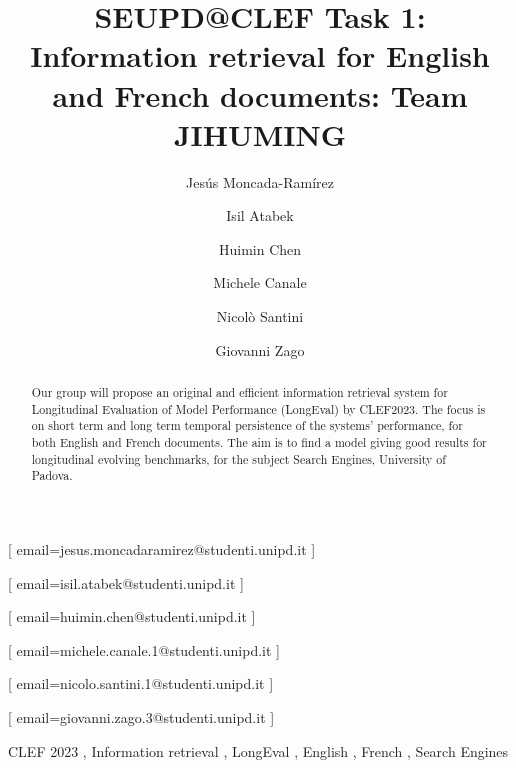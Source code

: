 \documentclass{ceurart}
\begin{document}


\title{SEUPD@CLEF Task 1: Information retrieval for English and French
documents: Team JIHUMING}

\author[1]{Jesús Moncada-Ramírez}[%
email=jesus.moncadaramirez@studenti.unipd.it
]

\author[1]{Isil Atabek}[%
email=isil.atabek@studenti.unipd.it
]

\author[1]{Huimin Chen}[%
email=huimin.chen@studenti.unipd.it
]

\author[1]{Michele	Canale}[%
email=michele.canale.1@studenti.unipd.it
]

\author[1]{Nicolò Santini}[%
email=nicolo.santini.1@studenti.unipd.it
]

\author[1]{Giovanni Zago}[%
email=giovanni.zago.3@studenti.unipd.it
]


\begin{abstract}
  Our group will propose an original and efficient information retrieval
  system for Longitudinal Evaluation of Model Performance (LongEval)
  by CLEF2023\cite{LongEval}. The focus is on short term and long term
  temporal persistence of the systems'  performance,
  for both English and French documents. The aim is to find a model giving
  good results for longitudinal evolving benchmarks,
  for the subject Search Engines, University of Padova.
\end{abstract}

\begin{keywords}
  CLEF 2023 \sep
  Information retrieval \sep
  LongEval \sep
  English \sep
  French \sep
  Search Engines
\end{keywords}
\end{document}
